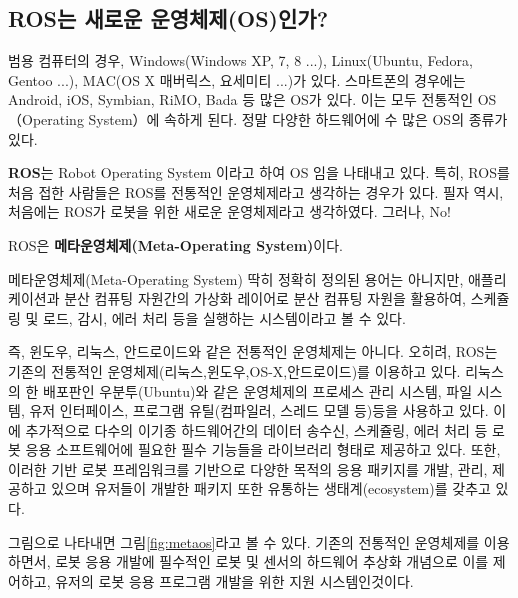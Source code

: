 \subsection{ROS는 새로운 운영체제(OS)인가?}

범용 컴퓨터의 경우, Windows(Windows XP, 7, 8 ...), Linux(Ubuntu, Fedora, Gentoo ...), MAC(OS X 매버릭스, 요세미티 ...)가 있다.
스마트폰의 경우에는 Android, iOS, Symbian, RiMO, Bada 등 많은 OS가 있다.
이는 모두 전통적인 OS（Operating System）에 속하게 된다.
정말 다양한 하드웨어에 수 많은 OS의 종류가 있다. 

\textbf{ROS}는 Robot Operating System 이라고 하여 OS 임을 나태내고 있다.
특히, ROS를 처음 접한 사람들은 ROS를 전통적인 운영체제라고 생각하는 경우가 있다.
필자 역시, 처음에는 ROS가 로봇을 위한 새로운 운영체제라고 생각하였다. 그러나, No!

\begin{center} 
ROS은 \textbf{메타운영체제(Meta-Operating System)}이다.
\end{center}

메타운영체제(Meta-Operating System) 딱히 정확히 정의된 용어는 아니지만, 애플리케이션과 분산 컴퓨팅 자원간의 가상화 레이어로 분산 컴퓨팅 자원을 활용하여, 스케쥴링 및 로드, 감시, 에러 처리 등을 실행하는 시스템이라고 볼 수 있다.

즉, 윈도우, 리눅스, 안드로이드와 같은 전통적인 운영체제는 아니다.
오히려, ROS는 기존의 전통적인 운영체제(리눅스,윈도우,OS-X,안드로이드)를 이용하고 있다.
리눅스의 한 배포판인 우분투(Ubuntu)와 같은 운영체제의 프로세스 관리 시스템, 파일 시스템, 유저 인터페이스, 프로그램 유틸(컴파일러, 스레드 모델 등)등을 사용하고 있다.
이에 추가적으로 다수의 이기종 하드웨어간의 데이터 송수신, 스케쥴링, 에러 처리 등 로봇 응용 소프트웨어에 필요한 필수 기능들을 라이브러리 형태로 제공하고 있다.
또한, 이러한 기반 로봇 프레임워크를 기반으로 다양한 목적의 응용 패키지를 개발, 관리, 제공하고 있으며 유저들이 개발한 패키지 또한 유통하는 생태계(ecosystem)를 갖추고 있다.

그림으로 나타내면 그림\ref{fig:metaos}라고 볼 수 있다. 기존의 전통적인 운영체제를 이용하면서, 로봇 응용 개발에 필수적인 로봇 및 센서의 하드웨어 추상화 개념으로 이를 제어하고, 유저의 로봇 응용 프로그램 개발을 위한 지원 시스템인것이다.

